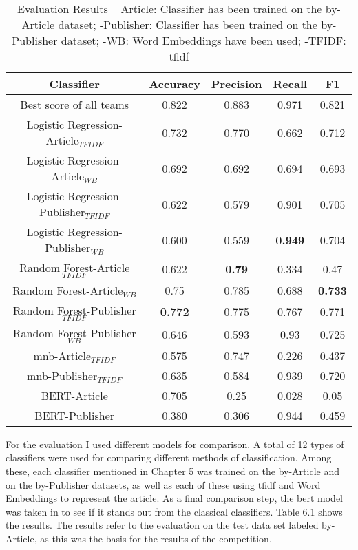 \documentclass[a4paper, 11pt,titlepage,oneside,openany]{book}
\begin{document}
\begin{table}[t]
	\centering
	\begin{tabular}{c|c|c|c|c}
		\toprule
		Classifier & Accuracy & Precision & Recall &F1  \\
		\midrule
		Best score of all teams & 0.822 & 0.883 & 0.971 & 0.821 \\
		\midrule
		Logistic Regression-Article$_{TFIDF}$ & 0.732 & 0.770 & 0.662 & 0.712 \\
		Logistic Regression-Article$_{WB}$ & 0.692 & 0.692 & 0.694 & 0.693 \\
		Logistic Regression-Publisher$_{TFIDF}$ & 0.622 & 0.579 & 0.901 & 0.705 \\
		Logistic Regression-Publisher$_{WB}$ & 0.600 & 0.559 & \textbf{0.949} & 0.704 \\
		Random Forest-Article$_{TFIDF}$ & 0.622 & \textbf{0.79} & 0.334 & 0.47 \\
		Random Forest-Article$_{WB}$ & 0.75 & 0.785 & 0.688 & \textbf{0.733} \\
		Random Forest-Publisher$_{TFIDF}$ & \textbf{0.772} & 0.775 & 0.767 & 0.771 \\
		Random Forest-Publisher$_{WB}$ & 0.646 & 0.593 & 0.93 & 0.725 \\
		\gls{mnb}-Article$_{TFIDF}$ & 0.575 & 0.747 & 0.226 & 0.437 \\
		\gls{mnb}-Publisher$_{TFIDF}$ & 0.635 & 0.584 & 0.939 & 0.720 \\
		BERT-Article & 0.705 & 0.25 & 0.028 & 0.05 \\
		BERT-Publisher & 0.380 & 0.306 & 0.944 & 0.459 \\
		\bottomrule
	\end{tabular}
	\caption{Evaluation Results -- Article: Classifier has been trained on the by-Article dataset; -Publisher: Classifier has been trained on the by-Publisher dataset; -WB: Word Embeddings have been used; -TFIDF: \gls{tfidf}}
\end{table}
\newpage
For the evaluation I used different models for comparison. A total of 12 types of classifiers were used for comparing different methods of classification. Among these, each classifier mentioned in Chapter 5 was trained on the by-Article and on the by-Publisher datasets, as well as each of these using \gls{tfidf} and Word Embeddings to represent the article. As a final comparison step, the \gls{bert} model was taken in to see if it stands out from the classical classifiers. Table 6.1 shows the results. The results refer to the evaluation on the test data set labeled by-Article, as this was the basis for the results of the competition. \\
\end{document}
